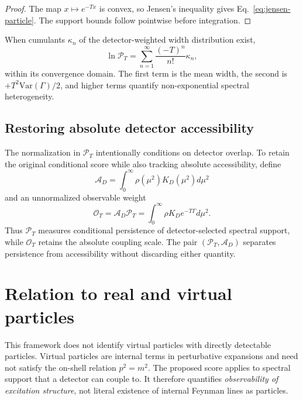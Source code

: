 \documentclass[11pt]{article}
\theoremstyle{remark}
\begin{document}
\begin{proof}
The map $x\mapsto e^{-Tx}$ is convex, so Jensen's inequality gives Eq.~\eqref{eq:jensen-particle}. The support bounds follow pointwise before integration.
\end{proof}

When cumulants $\kappa_n$ of the detector-weighted width distribution exist,
\begin{equation}
 \ln\mathcal P_T
 =\sum_{n=1}^\infty\frac{(-T)^n}{n!}\kappa_n,
 \label{eq:cumulant-expansion}
\end{equation}
within its convergence domain. The first term is the mean width, the second is $+T^2\mathrm{Var}(\Gamma)/2$, and higher terms quantify non-exponential spectral heterogeneity.

\subsection{Restoring absolute detector accessibility}
The normalization in $\mathcal P_T$ intentionally conditions on detector overlap. To retain the original conditional score while also tracking absolute accessibility, define
\begin{equation}
 \mathcal A_D=\int_0^\infty\rho(\mu^2)K_D(\mu^2)d\mu^2
 \label{eq:absolute-accessibility-old}
\end{equation}
and an unnormalized observable weight
\begin{equation}
 \mathcal O_T=\mathcal A_D\mathcal P_T
 =\int_0^\infty\rho K_D e^{-T\Gamma}d\mu^2.
 \label{eq:unnormalized-observability-old}
\end{equation}
Thus $\mathcal P_T$ measures conditional persistence of detector-selected spectral support, while $\mathcal O_T$ retains the absolute coupling scale. The pair $(\mathcal P_T,\mathcal A_D)$ separates persistence from accessibility without discarding either quantity.


\section{Relation to real and virtual particles}

This framework does not identify virtual particles with directly detectable particles. Virtual particles are internal terms in perturbative expansions and need not satisfy the on-shell relation $p^2=m^2$. The proposed score applies to spectral support that a detector can couple to. It therefore quantifies \emph{observability of excitation structure}, not literal existence of internal Feynman lines as particles.
\end{document}
